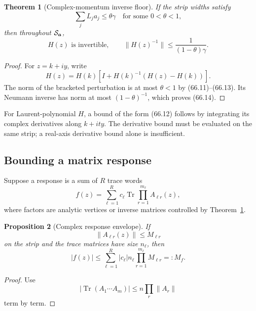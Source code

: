 \documentclass[11pt]{article}
\newtheorem{theorem}{Theorem}[section]
\newtheorem{proposition}[theorem]{Proposition}
\begin{document}
\begin{theorem}[Complex-momentum inverse floor]
\label{thm:v11v66-strip}
If the strip widths satisfy
\[
                              \sum_jL_ja_j\le\theta\gamma
                              \quad\text{for some }0<\theta<1,\tag{66.13}
\]
then throughout \({\cal S}_{\boldsymbol a}\),
\[
                 H(z)\text{ is invertible},\qquad
                 \lVert H(z)^{-1}\rVert
                      \le\frac1{(1-\theta)\gamma}.            \tag{66.14}
\]
\end{theorem}

\begin{proof}
For \(z=k+iy\), write
\[
 H(z)=H(k)\left[I+H(k)^{-1}(H(z)-H(k))\right].
\]
The norm of the bracketed perturbation is at most \(\theta<1\) by
(66.11)--(66.13).  Its Neumann inverse has norm at most
\((1-\theta)^{-1}\), which proves (66.14).
\end{proof}

For Laurent-polynomial \(H\), a bound of the form (66.12) follows by
integrating its complex derivatives along \(k+ity\).  The derivative
bound must be evaluated on the same strip; a real-axis derivative
bound alone is insufficient.

\subsection{Bounding a matrix response}

Suppose a response is a sum of \(R\) trace words
\[
                 f(z)=\sum_{\ell=1}^R c_\ell
                       \operatorname{Tr}
                       \prod_{r=1}^{m_\ell}A_{\ell r}(z),      \tag{66.15}
\]
where factors are analytic vertices or inverse matrices controlled by
Theorem~\ref{thm:v11v66-strip}.

\begin{proposition}[Complex response envelope]
\label{prop:v11v66-envelope}
If
\[
                         \lVert A_{\ell r}(z)\rVert
                                  \le M_{\ell r}               \tag{66.16}
\]
on the strip and the trace matrices have size \(n_\ell\), then
\[
                         |f(z)|
 \le\sum_{\ell=1}^R|c_\ell|n_\ell
                          \prod_{r=1}^{m_\ell}M_{\ell r}
 =:M_f.                                                       \tag{66.17}
\]
\end{proposition}

\begin{proof}
Use
\[
 |\operatorname{Tr}(A_1\cdots A_m)|
 \le n\prod_r\lVert A_r\rVert
\]
term by term.
\end{proof}
\end{document}
